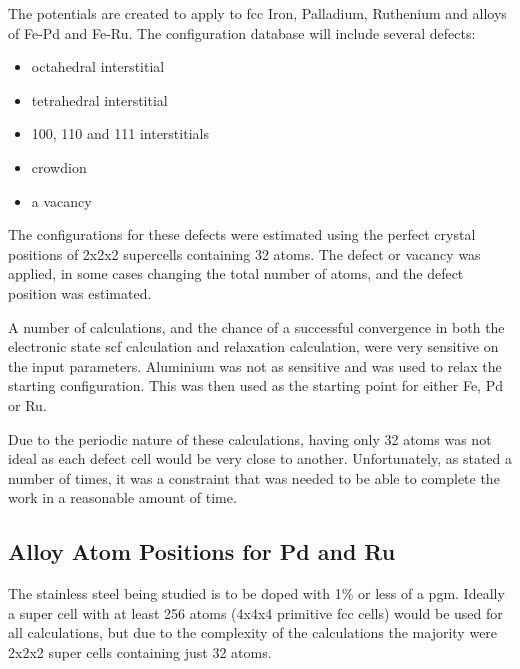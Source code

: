 The potentials are created to apply to \acrshort{fcc} Iron, Palladium, Ruthenium and alloys of Fe-Pd and Fe-Ru.  The configuration database will include several defects:

\begin{itemize}
\item octahedral interstitial
\item tetrahedral interstitial
\item 100, 110 and 111 interstitials
\item crowdion
\item a vacancy
\end{itemize}

The configurations for these defects were estimated using the perfect crystal positions of 2x2x2 supercells containing 32 atoms.  The defect or vacancy was applied, in some cases changing the total number of atoms, and the defect position was estimated.

A number of calculations, and the chance of a successful convergence in both the electronic state \acrshort{scf} calculation and relaxation calculation, were very sensitive on the input parameters.  Aluminium was not as sensitive and was used to relax the starting configuration.  This was then used as the starting point for either Fe, Pd or Ru.

Due to the periodic nature of these calculations, having only 32 atoms was not ideal as each defect cell would be very close to another.  Unfortunately, as stated a number of times, it was a constraint that was needed to be able to complete the work in a reasonable amount of time.

\FloatBarrier
\subsection{Alloy Atom Positions for Pd and Ru}

The stainless steel being studied is to be doped with 1\% or less of a \acrlong{pgm}.  Ideally a super cell with at least 256 atoms (4x4x4 primitive \acrshort{fcc} cells) would be used for all calculations, but due to the complexity of the calculations the majority were 2x2x2 super cells containing just 32 atoms.


